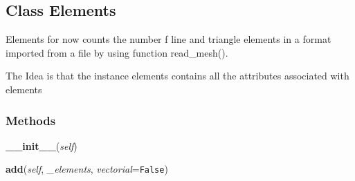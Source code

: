 

\subsection{Class Elements}

    \label{Classes:Elements}
Elements for now counts the number f line and triangle elements in a format
imported from a file by using function read\_mesh().

The Idea is that the instance elements contains all the attributes 
associated with elements



  \subsubsection{Methods}

    \label{Classes:Elements:__init__}

    \vspace{0.5ex}

\hspace{.8\funcindent}\begin{boxedminipage}{\funcwidth}

    \raggedright \textbf{\_\_init\_\_}(\textit{self})

\setlength{\parskip}{2ex}
\setlength{\parskip}{1ex}
    \end{boxedminipage}

    \label{Classes:Elements:add}

    \vspace{0.5ex}

\hspace{.8\funcindent}\begin{boxedminipage}{\funcwidth}

    \raggedright \textbf{add}(\textit{self}, \textit{\_elements}, \textit{vectorial}={\tt False})

\setlength{\parskip}{2ex}
\setlength{\parskip}{1ex}
    \end{boxedminipage}

